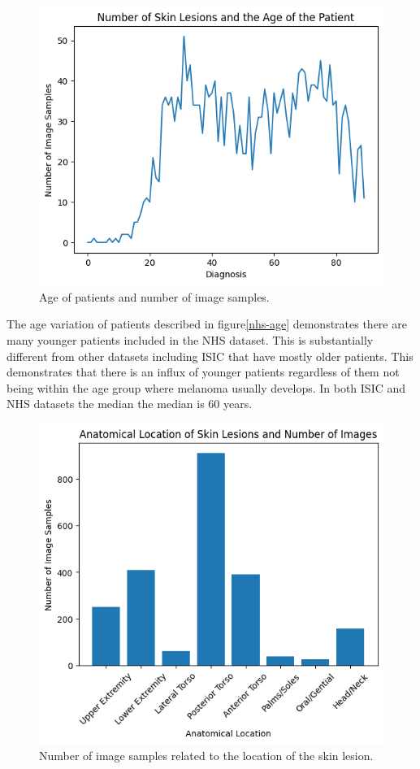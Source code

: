  \begin{figure}
    \centering
    \includegraphics[scale=0.75]{images/nhs/nhs-age.png}
    \caption{Age of patients and number of image samples.} 
\end{figure}\label{nhs-age}

The age variation of patients described in figure\ref{nhs-age} demonstrates there are many younger patients included in the NHS dataset. This is substantially different from other datasets including ISIC that have mostly older patients. This demonstrates that there is an influx of younger patients regardless of them not being within the age group where melanoma usually develops. In both ISIC and NHS datasets the median the median is 60 years.

\begin{figure}
    \centering
    \includegraphics[scale=0.75]{images/nhs/nhs-location.png}
    \caption{Number of image samples related to the location of the skin lesion.} 
\end{figure}\label{nhs-location}

